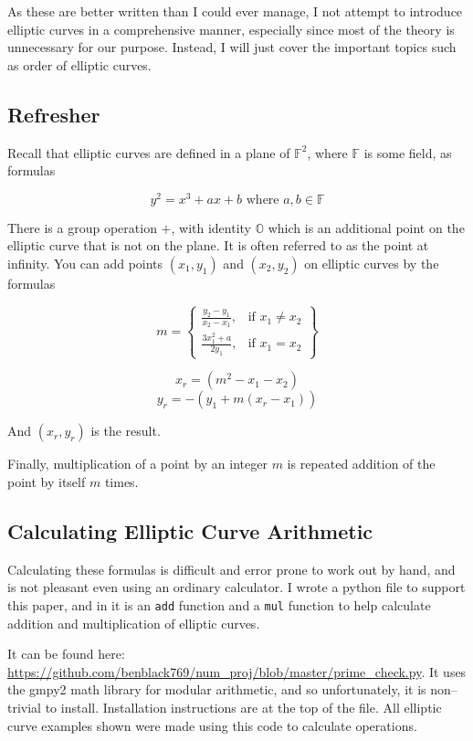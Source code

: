 \documentclass[]{article}
\newcommand{\OS}{\mathbb{O}}
\newcommand{\F}{\mathbb{F}}
\begin{document}
As these are better written than I could ever manage, I not attempt to introduce elliptic curves in a comprehensive manner, especially since most of the theory is unnecessary for our purpose. Instead, I will just cover the important topics such as order of elliptic curves.

\subsection{Refresher}

Recall that elliptic curves are defined in a plane of $\F^2$, where $\F$ is some field, as formulas

$$y^2 = x^3 + ax + b \text{ where }a, b \in \F$$

There is a group operation $+$, with identity $\OS$ which is an additional point on the elliptic curve that is not on the plane. It is often referred to as the point at infinity. You can add points $(x_1,y_1)$ and $(x_2,y_2)$ on elliptic curves by the formulas

\[
m = \left\{\begin{array}{lr}
\frac{y_2-y_1}{x_2-x_1}, & \text{if } x_1 \ne x_2 \\
\frac{3x_1^2+a}{2y_1}, & \text{if } x_1 = x_2
\end{array}\right\}
\]

$$x_r = (m^2-x_1 - x_2)$$
$$y_r = -(y_1 + m(x_r - x_1))$$

\noindent And $(x_r,y_r)$ is the result.

Finally, multiplication of a point by an integer $m$ is repeated addition of the point by itself $m$ times.

\subsection{Calculating Elliptic Curve Arithmetic}

Calculating these formulas is difficult and error prone to work out by hand, and is not pleasant even using an ordinary calculator. I wrote a python file to support this paper, and in it is an \texttt{add} function and a \texttt{mul} function to help calculate addition and multiplication of elliptic curves.

It can be found here: \url{https://github.com/benblack769/num_proj/blob/master/prime_check.py}.
It uses the gmpy2 math library for modular arithmetic, and so unfortunately, it is non--trivial to install. Installation instructions are at the top of the file. All elliptic curve examples shown were made using this code to calculate operations.
\end{document}

